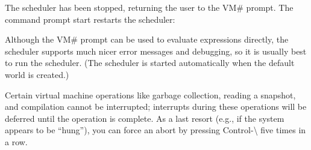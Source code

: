 \documentclass[letterpaper,10pt,english]{sphinxmanual}
\begin{document}
The scheduler has been stopped, returning the user to the VM\# prompt. The command prompt
start restarts the scheduler:

\begin{sphinxVerbatim}[commandchars=\\\{\}]
 
\end{sphinxVerbatim}

Although the VM\# prompt can be used to evaluate expressions directly, the scheduler supports
much nicer error messages and debugging, so it is usually best to run the scheduler. (The scheduler
is started automatically when the default world is created.)

Certain virtual machine operations like garbage collection, reading a snapshot, and compilation
cannot be interrupted; interrupts during these operations will be deferred until the operation is
complete. As a last resort (e.g., if the system appears to be “hung”), you can force an abort by
pressing Control-\textbackslash{} five times in a row.
\end{document}
